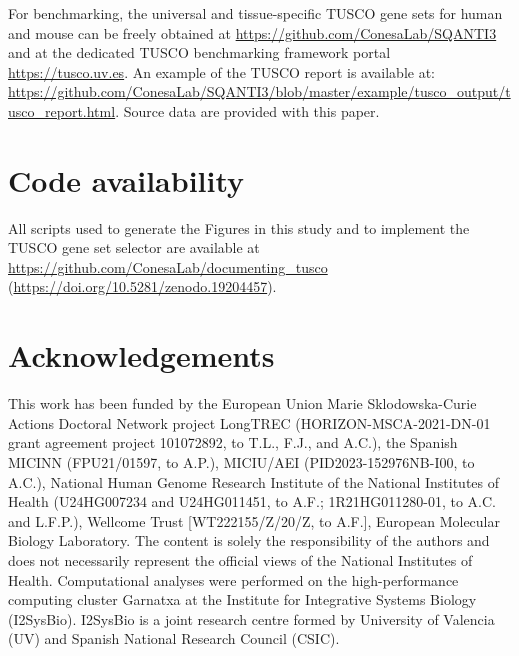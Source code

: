 \documentclass[pdflatex,sn-nature]{sn-jnl}%
\newcommand{\tuscoGeneSet}{TUSCO gene set}
\newcommand{\tuscoBenchmarkingFramework}{TUSCO benchmarking framework}
\begin{document}
For benchmarking, the universal and tissue-specific \tuscoGeneSet{}s for human and mouse can be freely obtained at \url{https://github.com/ConesaLab/SQANTI3} and at the dedicated \tuscoBenchmarkingFramework{} portal \url{https://tusco.uv.es}. An example of the TUSCO report is available at: \url{https://github.com/ConesaLab/SQANTI3/blob/master/example/tusco_output/tusco_report.html}. Source data are provided with this paper.


\section{Code availability}

All scripts used to generate the Figures in this study and to implement the \tuscoGeneSet{} selector are available at \url{https://github.com/ConesaLab/documenting_tusco} (\url{https://doi.org/10.5281/zenodo.19204457}).


\backmatter




\section{Acknowledgements}

This work has been funded by the European Union Marie Sklodowska-Curie Actions Doctoral Network project LongTREC (HORIZON-MSCA-2021-DN-01 grant agreement project 101072892, to T.L., F.J., and A.C.), the Spanish MICINN (FPU21/01597, to A.P.), MICIU/AEI (PID2023-152976NB-I00, to A.C.), National Human Genome Research Institute of the National Institutes of Health (U24HG007234 and U24HG011451, to A.F.; 1R21HG011280-01, to A.C. and L.F.P.), Wellcome Trust [WT222155/Z/20/Z, to A.F.], European Molecular Biology Laboratory. The content is solely the responsibility of the authors and does not necessarily represent the official views of the National Institutes of Health. Computational analyses were performed on the high-performance computing cluster Garnatxa at the Institute for Integrative Systems Biology (I2SysBio). I2SysBio is a joint research centre formed by University of Valencia (UV) and Spanish National Research Council (CSIC).
\end{document}
